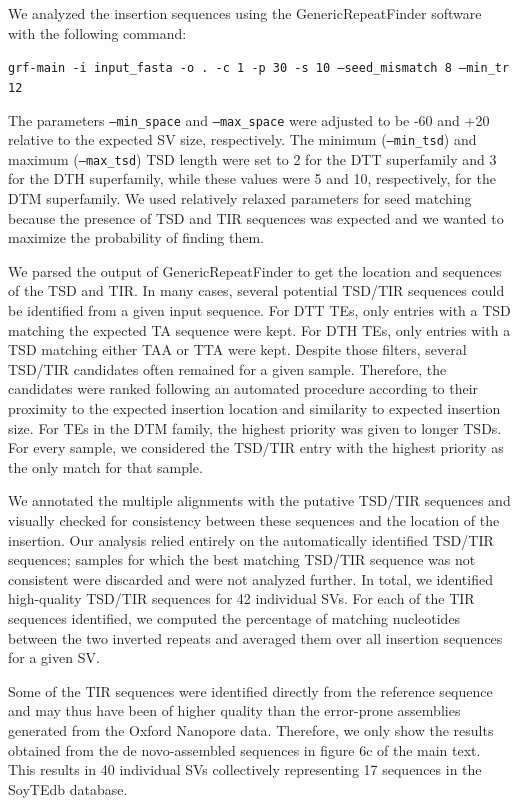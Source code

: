 \documentclass[12pt]{article}
\begin{document}
We analyzed the insertion sequences using the GenericRepeatFinder software \citep{grf} with the following command:

\texttt{grf-main -i input\_fasta -o . -c 1 -p 30 -s 10 --seed\_mismatch 8 --min\_tr 12}

The parameters \texttt{--min\_space} and \texttt{--max\_space} were adjusted to be -60 and +20 relative to the expected SV size, respectively. 
The minimum (\texttt{--min\_tsd}) and maximum (\texttt{--max\_tsd}) TSD length were set to 2 for the DTT superfamily and 3 for the DTH superfamily, while these values were 5 and 10, respectively, for the DTM superfamily. 
We used relatively relaxed parameters for seed matching because the presence of TSD and TIR sequences was expected and we wanted to maximize the probability of finding them.

We parsed the output of GenericRepeatFinder to get the location and sequences of the TSD and TIR.
In many cases, several potential TSD/TIR sequences could be identified from a given input sequence. 
For DTT TEs, only entries with a TSD matching the expected TA sequence were kept. 
For DTH TEs, only entries with a TSD matching either TAA or TTA were kept. 
Despite those filters, several TSD/TIR candidates often remained for a given sample.
Therefore, the candidates were ranked following an automated procedure according to their proximity to the expected insertion location and similarity to expected insertion size.
For TEs in the DTM family, the highest priority was given to longer TSDs.
For every sample, we considered the TSD/TIR entry with the highest priority as the only match for that sample.

We annotated the multiple alignments with the putative TSD/TIR sequences and visually checked for consistency between these sequences and the location of the insertion.
Our analysis relied entirely on the automatically identified TSD/TIR sequences; samples for which the best matching TSD/TIR sequence was not consistent were discarded and were not analyzed further.
In total, we identified high-quality TSD/TIR sequences for 42 individual SVs.
For each of the TIR sequences identified, we computed the percentage of matching nucleotides between the two inverted repeats and averaged them over all insertion sequences for a given SV.

Some of the TIR sequences were identified directly from the reference sequence and may thus have been of higher quality than the error-prone assemblies generated from the Oxford Nanopore data.
Therefore, we only show the results obtained from the de novo-assembled sequences in figure 6c of the main text.
This results in 40 individual SVs collectively representing 17 sequences in the SoyTEdb database.
\end{document}
